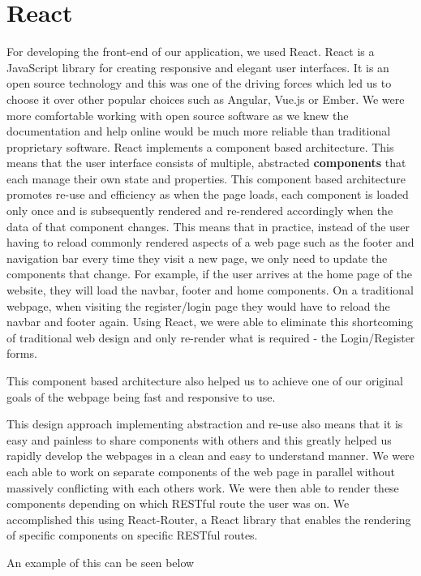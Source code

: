 \section{React}
For developing the front-end of our application, we used React. React is a JavaScript library for creating responsive and elegant user interfaces. It is an open source technology and this was one of the 
driving forces which led us to choose it over other popular choices such as Angular, Vue.js or Ember. We were more comfortable working with open source software as we knew the documentation and help online would be much more reliable than traditional proprietary software.
React implements a component based architecture. This means that the user interface consists of multiple, abstracted \textbf{components} that each manage their own state and properties.
This component based architecture promotes re-use and efficiency as when the page loads, each component is loaded only once and is subsequently rendered and re-rendered accordingly when the data of that component changes. This means that in practice, instead of the user having to reload commonly rendered aspects of a web page such as
the footer and navigation bar every time they visit a new page, we only need to update the components that change. For example, if the user arrives at the home page of the website, they will load the navbar, footer and home components. On a traditional webpage, when visiting the register/login page they would have to reload the navbar and footer again. 
Using React, we were able to eliminate this shortcoming of traditional web design and only re-render what is required - the Login/Register forms.

This component based architecture also helped us to achieve one of our original goals of the webpage being fast and responsive to use.

This design approach implementing abstraction and re-use also means that it is easy and painless to share components with others and this greatly helped us rapidly develop the webpages in a clean and easy to understand manner. We were each able to work on separate components of the web page in parallel without massively conflicting with each others work.
We were then able to render these components depending on which RESTful route the user was on. We accomplished this using React-Router, a React library that enables the rendering of specific components on specific RESTful routes.

An example of this can be seen below

